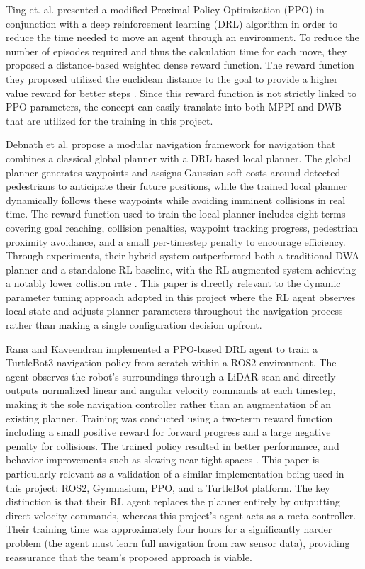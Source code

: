 \documentclass[conference]{IEEEtran}
\begin{document}
        Ting et. al. presented a modified Proximal Policy Optimization (PPO) in conjunction with a deep reinforcement learning (DRL) algorithm in
        order to reduce the time needed to move an agent through an environment. To reduce the number of episodes required and thus the calculation
        time for each move, they proposed a distance-based weighted dense reward function. The reward function they proposed utilized the euclidean
        distance to the goal to provide a higher value reward for better steps \cite{b4}. Since this reward function is not strictly linked to PPO
        parameters, the concept can easily translate into both MPPI and DWB that are utilized for the training in this project. 

        Debnath et al. propose a modular navigation framework for navigation that combines a classical global planner with a DRL based local planner.
        The global planner generates waypoints and assigns Gaussian soft costs around detected pedestrians to anticipate their future positions,
        while the trained local planner dynamically follows these waypoints while avoiding imminent collisions in real time. The reward function used
        to train the local planner includes eight terms covering goal reaching, collision penalties, waypoint tracking progress, pedestrian proximity
        avoidance, and a small per-timestep penalty to encourage efficiency. Through experiments, their hybrid system outperformed both a traditional
        DWA planner and a standalone RL baseline, with the RL-augmented system achieving a notably lower collision rate \cite{b9}. This paper is
        directly relevant to the dynamic parameter tuning approach adopted in this project where the RL agent observes local state and adjusts planner
        parameters throughout the navigation process rather than making a single configuration decision upfront.

        Rana and Kaveendran implemented a PPO-based DRL agent to train a TurtleBot3 navigation policy from scratch within a ROS2 environment. The
        agent observes the robot's surroundings through a LiDAR scan and directly outputs normalized linear and angular velocity commands at each
        timestep, making it the sole navigation controller rather than an augmentation of an existing planner. Training was conducted using a
        two-term reward function including a small positive reward for forward progress and a large negative penalty for collisions. The trained
        policy resulted in better performance, and behavior improvements such as slowing near tight spaces \cite{b10}. This paper is particularly
        relevant as a validation of a similar implementation being used in this project: ROS2, Gymnasium, PPO, and a TurtleBot platform. The key
        distinction is that their RL agent replaces the planner entirely by outputting direct velocity commands, whereas this project's agent acts as
        a meta-controller. Their training time was approximately four hours for a significantly harder problem (the agent must learn full navigation
        from raw sensor data), providing reassurance that the team's proposed approach is viable.
\end{document}
